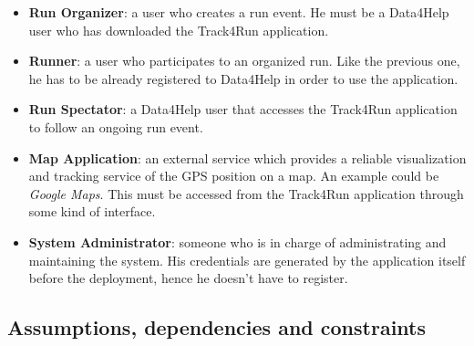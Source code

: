 \begin{itemize}
\item \textbf{Run Organizer}: a user who creates a run event. He must be a Data4Help user who has downloaded the Track4Run application.
 
\item \textbf{Runner}: a user who participates to an organized run. Like the previous one, he has to be already registered to Data4Help in order to use the application.

\item \textbf{Run Spectator}: a Data4Help user that accesses the Track4Run application to follow an ongoing run event.

\item \textbf{Map Application}: an external service which provides a reliable visualization and tracking service of the GPS position on a map. An example could be \textit{Google Maps}. This must be accessed from the Track4Run application through some kind of interface.

\item \textbf{System Administrator}: someone who is in charge of administrating and maintaining the system. His credentials are generated by the application itself before the deployment, hence he doesn't have to register.
\end{itemize}

\subsection{Assumptions, dependencies and constraints}

